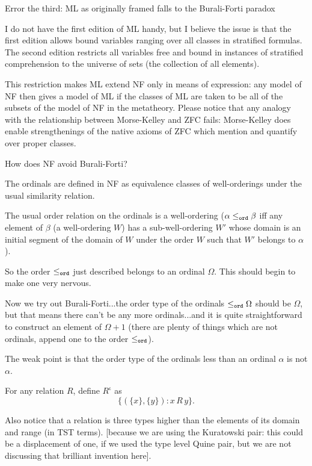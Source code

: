 \documentclass[12pt]{slides}
\begin{document}
\begin{slide}

{\Large Error the third:  ML as originally framed falls to the Burali-Forti paradox}

I do not have the first edition of ML handy, but I believe the issue is that the first edition allows bound variables ranging over all classes in stratified formulas.
The second edition restricts all variables free and bound in instances of stratified comprehension to the universe of sets (the collection of all elements).

This restriction makes ML extend NF only in means of expression:  any model of NF then gives a model of ML if the classes of ML are taken to be all of the subsets of the model of NF in the metatheory.  Please notice that any analogy with the relationship between Morse-Kelley and ZFC fails:  Morse-Kelley does enable strengthenings of the native axioms of ZFC which mention and quantify over proper classes.

\end{slide}

\begin{slide}

{\Large How does NF avoid Burali-Forti?}

The ordinals are defined in NF as equivalence classes of well-orderings under the usual similarity relation.

The usual order relation on the ordinals is a well-ordering ($\alpha \leq_{\tt ord} \beta$ iff any element of $\beta$ (a well-ordering $W$) has a sub-well-ordering $W'$ whose domain is an initial segment of the domain of $W$ under the order $W$ such that $W'$ belongs to $\alpha$).

So the order $\leq_{\tt ord}$ just described belongs to an ordinal $\Omega$.  This should begin to make one very nervous.

\end{slide}

\begin{slide}

Now we try out Burali-Forti...the order type of the ordinals $\leq_{\tt ord} \Omega$ should be $\Omega$, but that means there can't be any more ordinals...and it is quite straightforward to construct an element of $\Omega+1$ (there are plenty of things which are not ordinals, append one to the order $\leq_{\tt ord}$).

The weak point is that the order type of the ordinals less than an ordinal $\alpha$ is not $\alpha$.

For any relation $R$, define $R^\iota$ as $$\{(\{x\},\{y\}):x \, R\, y\}.$$

Also notice that a relation is three types higher than the elements of its domain and range (in TST terms).  [because we are using the Kuratowski pair:  this could be a displacement of one, if we used the type level Quine pair, but we are not discussing that brilliant invention here].

\end{slide}
\end{document}

